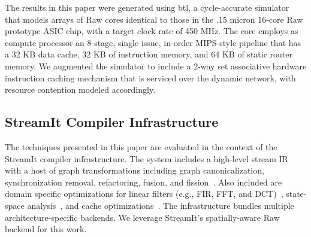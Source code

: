 The results in this paper were generated using btl, a cycle-accurate
simulator that models arrays of Raw cores identical to those in the
.15 micron 16-core Raw prototype ASIC chip, with a target clock rate
of 450 MHz. The core employs as compute processor an 8-stage, single
issue, in-order MIPS-style pipeline that has a 32 KB data cache, 32 KB
of instruction memory, and 64 KB of static router memory.  We
augmented the simulator to include a 2-way set associative hardware
instruction caching mechanism that is serviced over the dynamic
network, with resource contention modeled accordingly. 





\subsection{StreamIt Compiler Infrastructure}
The techniques presented in this paper are evaluated in the context of
the StreamIt compiler infrastructure.  The system includes a
high-level stream IR with a host of graph transformations including
graph canonicalization, synchronization removal, refactoring, fusion,
and fission~\cite{streamit-asplos}.  Also included are domain specific
optimizations for linear filters (e.g., FIR, FFT, and
DCT)~\cite{lamb:pldi:2003}, state-space
analysis~\cite{agrawal:cases:2005}, and cache
optimizations~\cite{sermulins:lctes:2005}.  The infrastructure bundles
multiple architecture-specific backends.  We leverage StreamIt's
spatially-aware Raw backend for this work.

